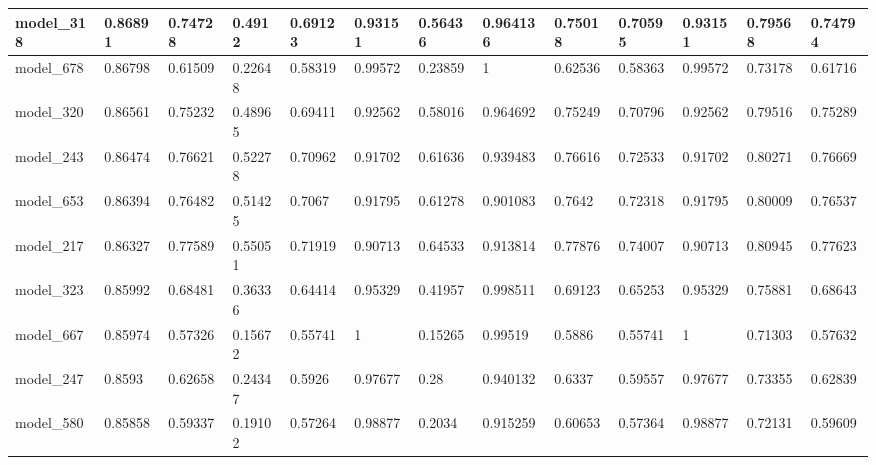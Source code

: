 \begin{tabular}{|l|l|l|l|l|l|l|l|l|l|l|l|l|}
model\_318     & 0.86891     & 0.74728        & 0.4912       & 0.69123          & 0.93151              & 0.56436              & 0.964136     & 0.75018           & 0.70595            & 0.93151         & 0.79568     & 0.74794      \\ \hline
model\_678     & 0.86798     & 0.61509        & 0.22648      & 0.58319          & 0.99572              & 0.23859              & 1            & 0.62536           & 0.58363            & 0.99572         & 0.73178     & 0.61716      \\ \hline
model\_320     & 0.86561     & 0.75232        & 0.48965      & 0.69411          & 0.92562              & 0.58016              & 0.964692     & 0.75249           & 0.70796            & 0.92562         & 0.79516     & 0.75289      \\ \hline
model\_243     & 0.86474     & 0.76621        & 0.52278      & 0.70962          & 0.91702              & 0.61636              & 0.939483     & 0.76616           & 0.72533            & 0.91702         & 0.80271     & 0.76669      \\ \hline
model\_653     & 0.86394     & 0.76482        & 0.51425      & 0.7067           & 0.91795              & 0.61278              & 0.901083     & 0.7642            & 0.72318            & 0.91795         & 0.80009     & 0.76537      \\ \hline
model\_217     & 0.86327     & 0.77589        & 0.55051      & 0.71919          & 0.90713              & 0.64533              & 0.913814     & 0.77876           & 0.74007            & 0.90713         & 0.80945     & 0.77623      \\ \hline
model\_323     & 0.85992     & 0.68481        & 0.36336      & 0.64414          & 0.95329              & 0.41957              & 0.998511     & 0.69123           & 0.65253            & 0.95329         & 0.75881     & 0.68643      \\ \hline
model\_667     & 0.85974     & 0.57326        & 0.15672      & 0.55741          & 1                    & 0.15265              & 0.99519      & 0.5886            & 0.55741            & 1               & 0.71303     & 0.57632      \\ \hline
model\_247     & 0.8593      & 0.62658        & 0.24347      & 0.5926           & 0.97677              & 0.28                 & 0.940132     & 0.6337            & 0.59557            & 0.97677         & 0.73355     & 0.62839      \\ \hline
model\_580     & 0.85858     & 0.59337        & 0.19102      & 0.57264          & 0.98877              & 0.2034               & 0.915259     & 0.60653           & 0.57364            & 0.98877         & 0.72131     & 0.59609      \\ \hline

\end{tabular}
